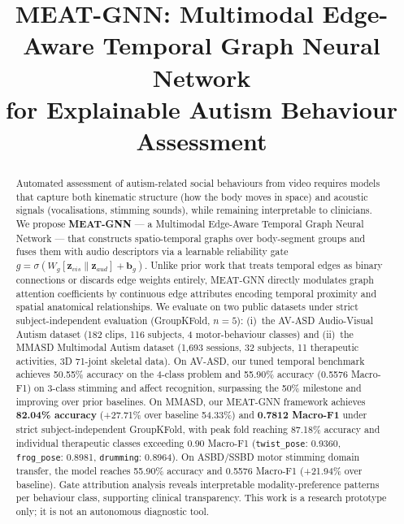\documentclass[conference]{IEEEtran}
\begin{document}
\title{MEAT-GNN: Multimodal Edge-Aware Temporal Graph Neural Network\\
for Explainable Autism Behaviour Assessment}

\author{
}

\maketitle

\begin{abstract}
Automated assessment of autism-related social behaviours from video requires models 
that capture both kinematic structure (how the body moves in space) and acoustic signals 
(vocalisations, stimming sounds), while remaining interpretable to clinicians. 
We propose \textbf{MEAT-GNN} — a Multimodal Edge-Aware Temporal Graph Neural Network 
— that constructs spatio-temporal graphs over body-segment groups and fuses them with 
audio descriptors via a learnable reliability gate 
$g = \sigma(W_g[\mathbf{z}_{vis} \| \mathbf{z}_{aud}] + \mathbf{b}_g)$.
Unlike prior work that treats temporal edges as binary connections or discards edge 
weights entirely, MEAT-GNN directly modulates graph attention coefficients by continuous 
edge attributes encoding temporal proximity and spatial anatomical relationships. 
We evaluate on two public datasets under strict subject-independent evaluation 
(GroupKFold, $n{=}5$): (i)~the AV-ASD Audio-Visual Autism dataset (182 clips, 
116 subjects, 4 motor-behaviour classes) and (ii)~the MMASD Multimodal Autism dataset 
(1,693 sessions, 32 subjects, 11 therapeutic activities, 3D 71-joint skeletal data).
On AV-ASD, our tuned temporal benchmark achieves 50.55\% accuracy on the 4-class problem and 55.90\% accuracy (0.5576 Macro-F1) on 3-class stimming and affect recognition, surpassing the 50\% milestone and improving over prior baselines.
On MMASD, our MEAT-GNN framework achieves \textbf{82.04\% accuracy} (+27.71\% over baseline 54.33\%) and \textbf{0.7812 Macro-F1} under strict subject-independent GroupKFold, with peak fold reaching 87.18\% accuracy and individual therapeutic classes exceeding 0.90 Macro-F1 (\texttt{twist\_pose}: 0.9360, \texttt{frog\_pose}: 0.8981, \texttt{drumming}: 0.8964).
On ASBD/SSBD motor stimming domain transfer, the model reaches 55.90\% accuracy and 0.5576 Macro-F1 (+21.94\% over baseline).
Gate attribution analysis reveals interpretable modality-preference patterns per 
behaviour class, supporting clinical transparency.
This work is a research prototype only; it is not an autonomous diagnostic tool.
\end{abstract}
\end{document}
